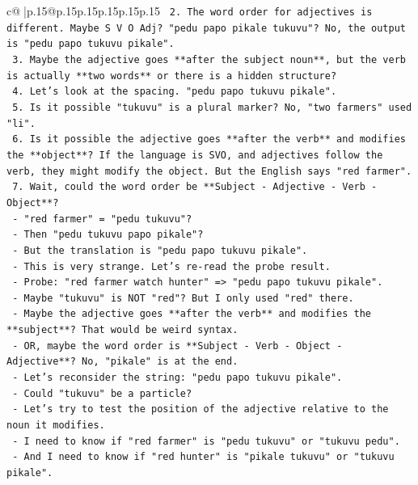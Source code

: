 \documentclass{article}
\begin{document}
{\begin{supertabular}{c@{$\;$}|p{.15\linewidth}@{}p{.15\linewidth}p{.15\linewidth}p{.15\linewidth}p{.15\linewidth}p{.15\linewidth}}
{{{\texttt{    2. The word order for adjectives is different. Maybe S V O Adj? "pedu papo pikale tukuvu"? No, the output is "pedu papo tukuvu pikale".} \\
\texttt{    3. Maybe the adjective goes **after the subject noun**, but the verb is actually **two words** or there is a hidden structure?} \\
\texttt{    4. Let's look at the spacing. "pedu papo tukuvu pikale".} \\
\texttt{    5. Is it possible "tukuvu" is a plural marker? No, "two farmers" used "li".} \\
\texttt{    6. Is it possible the adjective goes **after the verb** and modifies the **object**? If the language is SVO, and adjectives follow the verb, they might modify the object. But the English says "red farmer".} \\
\texttt{    7. Wait, could the word order be **Subject {-} Adjective {-} Verb {-} Object**?} \\
\texttt{       {-} "red farmer" = "pedu tukuvu"?} \\
\texttt{       {-} Then "pedu tukuvu papo pikale"?} \\
\texttt{       {-} But the translation is "pedu papo tukuvu pikale".} \\
\texttt{       {-} This is very strange. Let's re{-}read the probe result.} \\
\texttt{       {-} Probe: "red farmer watch hunter" => "pedu papo tukuvu pikale".} \\
\texttt{       {-} Maybe "tukuvu" is NOT "red"? But I only used "red" there.} \\
\texttt{       {-} Maybe the adjective goes **after the verb** and modifies the **subject**? That would be weird syntax.} \\
\texttt{       {-} OR, maybe the word order is **Subject {-} Verb {-} Object {-} Adjective**? No, "pikale" is at the end.} \\
\texttt{       {-} Let's reconsider the string: "pedu papo tukuvu pikale".} \\
\texttt{       {-} Could "tukuvu" be a particle?} \\
\texttt{       {-} Let's try to test the position of the adjective relative to the noun it modifies.} \\
\texttt{       {-} I need to know if "red farmer" is "pedu tukuvu" or "tukuvu pedu".} \\
\texttt{       {-} And I need to know if "red hunter" is "pikale tukuvu" or "tukuvu pikale".} \\
}}}
\end{supertabular}}
\end{document}
